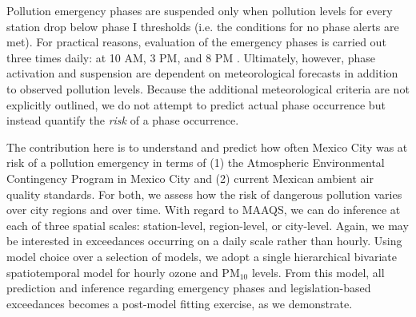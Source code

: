 \documentclass[alpha-refs]{wiley-article}
\begin{document}
Pollution emergency phases are suspended only when pollution levels for every station drop below phase I thresholds (i.e. the conditions for no phase alerts are met).  For practical reasons, evaluation of the emergency phases is carried out three times daily: at 10 AM, 3 PM, and 8 PM \citep{mc2016}. Ultimately, however, phase activation and suspension are dependent on meteorological forecasts in addition to observed pollution levels. Because the additional meteorological criteria are not explicitly outlined, we do not attempt to predict actual phase occurrence but instead quantify the \emph{risk} of a phase occurrence.

The contribution here is to understand and predict how often Mexico City was at risk of a pollution emergency in terms of (1) the Atmospheric Environmental Contingency Program in Mexico City and (2) current Mexican ambient air quality standards. For both, we assess how the risk of dangerous pollution varies over city regions and over time.
With regard to MAAQS, we can do inference at each of three spatial scales: station-level, region-level, or city-level. Again, we may be interested in exceedances occurring on a daily scale rather than hourly. %
Using model choice over a selection of models, we adopt a single hierarchical bivariate spatiotemporal model for hourly ozone and $\text{PM}_{10}$ levels.
From this model, all prediction and inference regarding emergency phases and legislation-based exceedances becomes a post-model fitting exercise, as we demonstrate.
\end{document}
